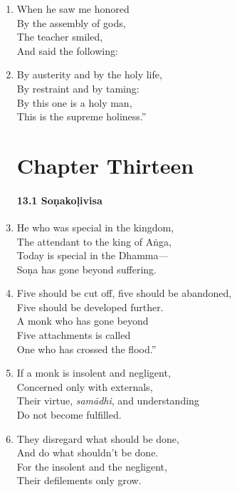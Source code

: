\documentclass[10pt, openany]{book}
\newcommand*{\vleftofline}[1]{\leavevmode\llap{#1}}
\begin{document}
\begin{enumerate}
\item When he saw me honored\\
By the assembly of gods,\\
The teacher smiled,\\
And said the following:

\item \vleftofline{“}By austerity and by the holy life,\\
By restraint and by taming:\\
By this one is a holy man,\\
This is the supreme holiness.”

\chapter*{Chapter Thirteen}

\subsubsection*{13.1 Soṇakoḷivisa}

\item He who was special in the kingdom,\\
The attendant to the king of Aṅga,\\
Today is special in the Dhamma—\\
Soṇa has gone beyond suffering.

\item Five should be cut off, five should be abandoned,\\
Five should be developed further.\\
A monk who has gone beyond \\
Five attachments is called\\
\vleftofline{“}One who has crossed the flood.”

\item If a monk is insolent and negligent,\\
Concerned only with externals,\\
Their virtue, \emph{samādhi}, and understanding\\
Do not become fulfilled.

\item They disregard what should be done,\\
And do what shouldn’t be done.\\
For the insolent and the negligent,\\
Their defilements only grow.


\end{enumerate}
\end{document}
